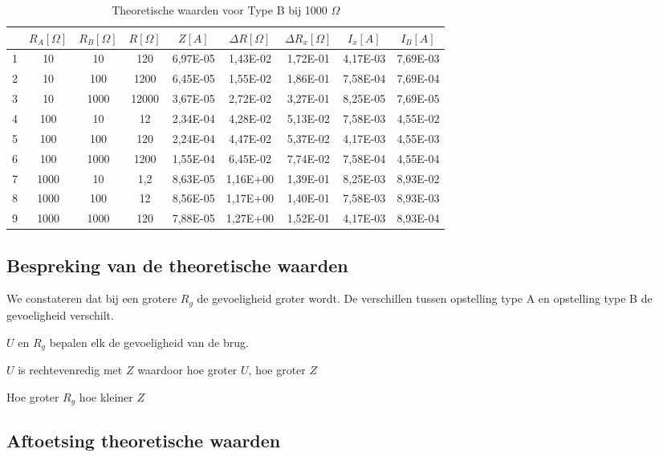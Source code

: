 \begin{table}[H]
    \centering
    \label{tab:TB1OO0}
    \caption{Theoretische waarden voor Type B bij 1000 $\Omega$}
    \begin{tabular}{| c | c | c | c | c | c | c | c | c |}
        \hline
                & $R_A [\Omega]$    & $R_B [\Omega]$    & $R [\Omega]$  & $Z [A]$   & $\Delta R [\Omega]$   & $\Delta R_x [\Omega]$ & $I_x [A]$                 & $I_B [A]$             \\ \hline
                1	&10	&10	&120	&6,97E-05	&1,43E-02	&1,72E-01	&4,17E-03	&7,69E-03 \\ \hline
                2	&10	&100	&1200	&6,45E-05	&1,55E-02	&1,86E-01	&7,58E-04	&7,69E-04\\ \hline
                3	&10	&1000	&12000	&3,67E-05	&2,72E-02	&3,27E-01	&8,25E-05	&7,69E-05\\ \hline
                4	&100	&10	&12	&2,34E-04	&4,28E-02	&5,13E-02	&7,58E-03	&4,55E-02\\ \hline
                5	&100	&100	&120	&2,24E-04	&4,47E-02	&5,37E-02	&4,17E-03	&4,55E-03\\ \hline
                6	&100	&1000	&1200	&1,55E-04	&6,45E-02	&7,74E-02	&7,58E-04	&4,55E-04\\ \hline
                7	&1000	&10	&1,2	&8,63E-05	&1,16E+00	&1,39E-01	&8,25E-03	&8,93E-02\\ \hline
                8	&1000	&100	&12	&8,56E-05	&1,17E+00	&1,40E-01	&7,58E-03	&8,93E-03\\ \hline
                9	&1000	&1000	&120	&7,88E-05	&1,27E+00	&1,52E-01	&4,17E-03	&8,93E-04  \\ \hline
    \end{tabular}
\end{table}
\subsection{Bespreking van de theoretische waarden}
We constateren dat bij een grotere $R_{g}$ de gevoeligheid groter wordt. 
De verschillen tussen opstelling type A en opstelling type B de gevoeligheid verschilt.

$U$ en $R_g$ bepalen elk de gevoeligheid van de brug.

$U$ is rechtevenredig met $Z$ waardoor hoe groter $U$, hoe groter
$Z$

Hoe groter $R_g$ hoe kleiner $Z$

\subsection{Aftoetsing theoretische waarden}

